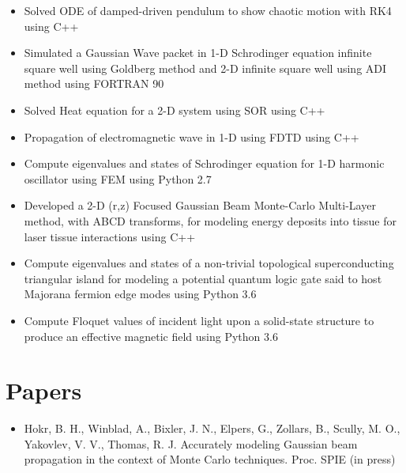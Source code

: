 \documentclass[11pt]{tccv}
\begin{document}
\begin{itemize}
  \item{Solved ODE of damped-driven pendulum to show chaotic motion with RK4 using C++}

  \item{Simulated a Gaussian Wave packet in 1-D Schrodinger equation infinite square well using Goldberg method and 2-D infinite square well using ADI method using FORTRAN 90}

  \item{Solved Heat equation for a 2-D system using SOR using C++}

  \item{Propagation of electromagnetic wave in 1-D using FDTD using C++}

  \item{Compute eigenvalues and states of \newline Schrodinger equation for 1-D harmonic oscillator using FEM using Python 2.7}

  \item{Developed a 2-D (r,z) Focused Gaussian Beam Monte-Carlo Multi-Layer method, with ABCD transforms, for modeling energy deposits into tissue for laser tissue interactions using C++}

  \item{Compute eigenvalues and states of a non-trivial topological superconducting triangular island for modeling a potential quantum logic gate said to host Majorana fermion edge modes using Python 3.6}

  \item{Compute Floquet values of incident light upon a solid-state structure to produce an effective magnetic field using Python 3.6}

\end{itemize}

\section{Papers}

\begin{itemize}

\item{Hokr, B. H., Winblad, A., Bixler, J. N., Elpers, G., Zollars, B., Scully, M. O., Yakovlev, V. V., Thomas, R. J. Accurately modeling Gaussian beam propagation in the context of Monte Carlo techniques. Proc. SPIE (in press)}

\end{itemize}
\end{document}

